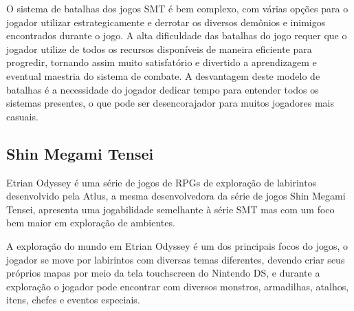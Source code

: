\documentclass[
	12pt,				%
	openright,			%
	twoside,			%
	a4paper,			%
	english,			%
	french,				%
	spanish,			%
	brazil				%
	]{abntex2}
\begin{document}
O sistema de batalhas dos jogos SMT é bem complexo, com várias opções para o jogador utilizar estrategicamente e derrotar os diversos demônios e inimigos encontrados durante o jogo. A alta dificuldade das batalhas do jogo requer que o jogador utilize de todos os recursos disponíveis de maneira eficiente para progredir, tornando assim muito satisfatório e divertido a aprendizagem e eventual maestria do sistema de combate. A desvantagem deste modelo de batalhas é a necessidade do jogador dedicar tempo para entender todos os sistemas presentes, o que pode ser desencorajador para muitos jogadores mais casuais.

\subsection{Shin Megami Tensei}

Etrian Odyssey é uma série de jogos de RPGs de exploração de labirintos desenvolvido pela Atlus, a mesma desenvolvedora da série de jogos Shin Megami Tensei, apresenta uma jogabilidade semelhante à série SMT mas com um foco bem maior em exploração de ambientes.

	A exploração do mundo em Etrian Odyssey é um dos principais focos do jogos, o jogador se move por labirintos com diversas temas diferentes, devendo criar seus próprios mapas por meio da tela touchscreen do Nintendo DS, e durante a exploração o jogador pode encontrar com diversos monstros, armadilhas, atalhos, itens, chefes e eventos especiais.
\end{document}

